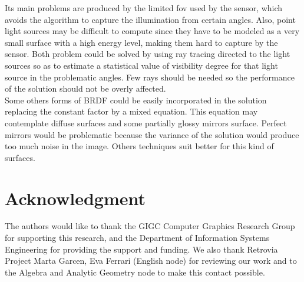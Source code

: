 \documentclass[10pt, conference]{IEEEtran}
\begin{document}
Its main problems are produced by the limited fov used by the sensor, which avoids the algorithm to capture the illumination from certain angles.
Also, point light sources may be difficult to compute since they have to be modeled as a very small surface with a high energy level, making them hard to capture by the sensor.
Both problem could be solved by using ray tracing directed to the light sources so as to estimate a statistical value of visibility degree for that light source in the problematic angles. 
Few rays should be needed so the performance of the solution should not be overly affected.\\

Some others forms of BRDF could be easily incorporated in the solution replacing the constant factor by a mixed equation. This equation may contemplate diffuse surfaces and some partially glossy mirrors surface. Perfect mirrors would be problematic because the variance of the solution would produce too much noise in the image. Others techniques suit better for this kind of surfaces.\\






\iffinal
\section*{Acknowledgment}
%
The authors would like to thank the GIGC Computer Graphics Research Group for supporting this research, and the Department of Information Systems 
Engineering for providing the support and funding. We also thank Retrovia Project Marta Garcen, Eva Ferrari (English node) for reviewing our work 
and to the Algebra and Analytic Geometry node to make this contact possible.
\fi








\end{document}
